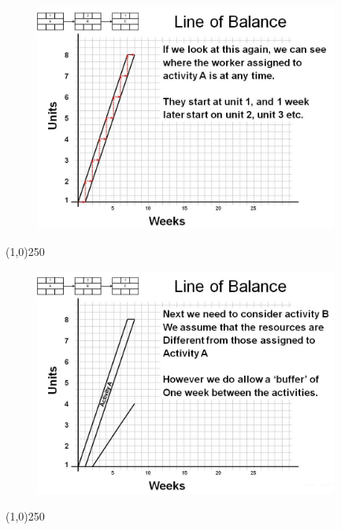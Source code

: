 \begin{frame}
\begin{figure}
	\centering
		\includegraphics[width = 10.0cm]{oldnotes/Slide246.jpg}
\end{figure}
\end{frame}
\begin{center}\line(1,0){250}\end{center}






\begin{frame}
\begin{figure}
	\centering
		\includegraphics[width = 10.0cm]{oldnotes/Slide247.jpg}
\end{figure}
\end{frame}
\begin{center}\line(1,0){250}\end{center}






